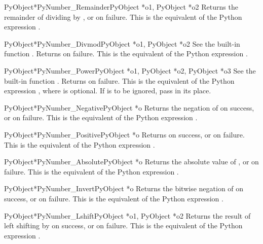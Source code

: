 \documentclass{manual}
\begin{document}
\begin{cfuncdesc}{PyObject*}{PyNumber_Remainder}{PyObject *o1, PyObject *o2}
Returns the remainder of dividing  by , or \NULL{} on
failure.  This is the equivalent of the Python expression
.
\end{cfuncdesc}


\begin{cfuncdesc}{PyObject*}{PyNumber_Divmod}{PyObject *o1, PyObject *o2}
See the built-in function .
Returns \NULL{} on failure.  This is the equivalent of the Python
expression .
\end{cfuncdesc}


\begin{cfuncdesc}{PyObject*}{PyNumber_Power}{PyObject *o1, PyObject *o2, PyObject *o3}
See the built-in function .  Returns
\NULL{} on failure. This is the equivalent of the Python expression
, where  is optional.
If  is to be ignored, pass  in its place.
\end{cfuncdesc}


\begin{cfuncdesc}{PyObject*}{PyNumber_Negative}{PyObject *o}
Returns the negation of  on success, or \NULL{} on failure.
This is the equivalent of the Python expression .
\end{cfuncdesc}


\begin{cfuncdesc}{PyObject*}{PyNumber_Positive}{PyObject *o}
Returns  on success, or \NULL{} on failure.
This is the equivalent of the Python expression .
\end{cfuncdesc}


\begin{cfuncdesc}{PyObject*}{PyNumber_Absolute}{PyObject *o}
Returns the absolute value of , or \NULL{} on failure.  This is
the equivalent of the Python expression .
\end{cfuncdesc}


\begin{cfuncdesc}{PyObject*}{PyNumber_Invert}{PyObject *o}
Returns the bitwise negation of  on success, or \NULL{} on
failure.  This is the equivalent of the Python expression
.
\end{cfuncdesc}


\begin{cfuncdesc}{PyObject*}{PyNumber_Lshift}{PyObject *o1, PyObject *o2}
Returns the result of left shifting  by  on success,
or \NULL{} on failure.  This is the equivalent of the Python
expression .
\end{cfuncdesc}
\end{document}
